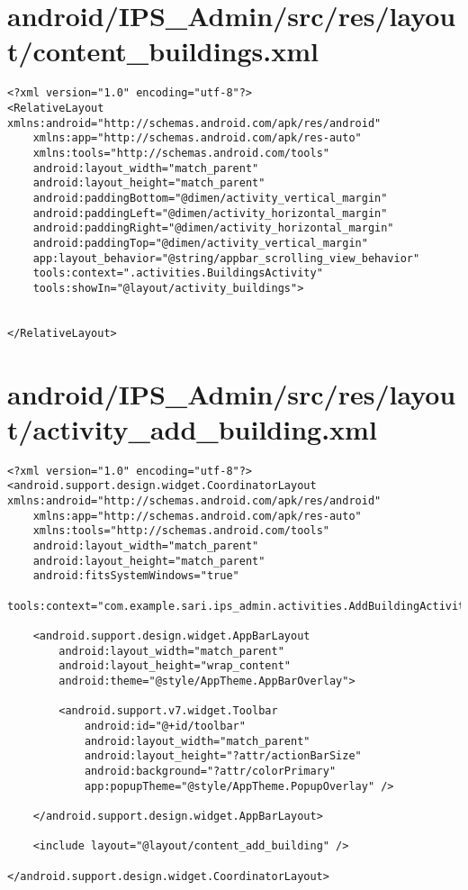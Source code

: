 \section{android/IPS\_Admin/src/res/layout/content\_buildings.xml}
\begin{lstlisting}<?xml version="1.0" encoding="utf-8"?>
<RelativeLayout xmlns:android="http://schemas.android.com/apk/res/android"
    xmlns:app="http://schemas.android.com/apk/res-auto"
    xmlns:tools="http://schemas.android.com/tools"
    android:layout_width="match_parent"
    android:layout_height="match_parent"
    android:paddingBottom="@dimen/activity_vertical_margin"
    android:paddingLeft="@dimen/activity_horizontal_margin"
    android:paddingRight="@dimen/activity_horizontal_margin"
    android:paddingTop="@dimen/activity_vertical_margin"
    app:layout_behavior="@string/appbar_scrolling_view_behavior"
    tools:context=".activities.BuildingsActivity"
    tools:showIn="@layout/activity_buildings">


</RelativeLayout>
\end{lstlisting}
\newpage
\section{android/IPS\_Admin/src/res/layout/activity\_add\_building.xml}
\begin{lstlisting}<?xml version="1.0" encoding="utf-8"?>
<android.support.design.widget.CoordinatorLayout xmlns:android="http://schemas.android.com/apk/res/android"
    xmlns:app="http://schemas.android.com/apk/res-auto"
    xmlns:tools="http://schemas.android.com/tools"
    android:layout_width="match_parent"
    android:layout_height="match_parent"
    android:fitsSystemWindows="true"
    tools:context="com.example.sari.ips_admin.activities.AddBuildingActivity">

    <android.support.design.widget.AppBarLayout
        android:layout_width="match_parent"
        android:layout_height="wrap_content"
        android:theme="@style/AppTheme.AppBarOverlay">

        <android.support.v7.widget.Toolbar
            android:id="@+id/toolbar"
            android:layout_width="match_parent"
            android:layout_height="?attr/actionBarSize"
            android:background="?attr/colorPrimary"
            app:popupTheme="@style/AppTheme.PopupOverlay" />

    </android.support.design.widget.AppBarLayout>

    <include layout="@layout/content_add_building" />

</android.support.design.widget.CoordinatorLayout>
\end{lstlisting}
\newpage
